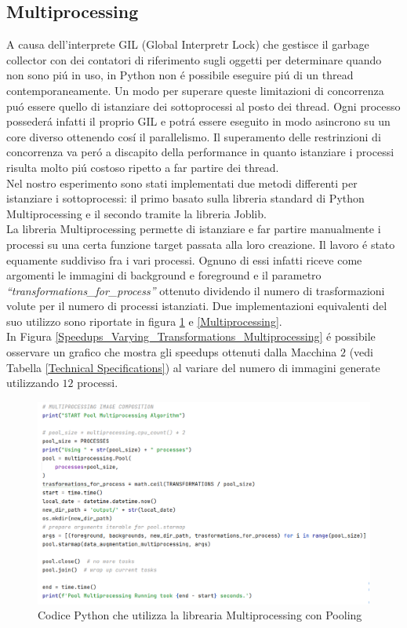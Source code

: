 \documentclass{article}
\begin{document}
\subsection{Multiprocessing}
A causa dell'interprete GIL (Global Interpretr Lock) che gestisce il garbage collector con dei contatori di riferimento sugli oggetti per determinare quando non sono pi\'u in uso, in Python non \'e possibile eseguire pi\'u di un thread contemporaneamente. Un modo per superare queste limitazioni di concorrenza pu\'o essere quello di istanziare dei sottoprocessi al posto dei thread. Ogni processo posseder\'a infatti il proprio GIL e potr\'a essere eseguito in modo asincrono su un core diverso ottenendo cos\'i il parallelismo. Il superamento delle restrinzioni di concorrenza va per\'o a discapito della performance in quanto istanziare i processi risulta molto pi\'u costoso ripetto a far partire dei thread.\\
Nel nostro esperimento sono stati implementati due metodi differenti per istanziare i sottoprocessi: il primo basato sulla libreria standard di Python Multiprocessing e il secondo tramite la libreria Joblib.\\
La libreria Multiprocessing permette di istanziare e far partire manualmente i processi su una certa funzione target passata alla loro creazione. Il lavoro \'e stato equamente suddiviso fra i vari processi. Ognuno di essi infatti riceve come argomenti le immagini di background e foreground e il parametro \textit{“transformations\_for\_process”} ottenuto dividendo il numero di trasformazioni volute per il numero di processi istanziati. Due implementazioni equivalenti del suo utilizzo sono riportate in figura \ref{Pool} e \ref{Multiprocessing}.
\\ In Figura \ref{Speedups_Varying_Transformations_Multiprocessing} \'e possibile osservare un grafico che mostra gli speedups ottenuti dalla Macchina $ 2 $ (vedi Tabella \ref{Technical Specifications}) al variare del numero di immagini generate utilizzando $ 12 $ processi.

\vspace{20px}

\begin{figure}[!h]
\centering
\includegraphics[width= 12.5cm]{"Immagini/Pool.PNG"}
\caption{Codice Python che utilizza la librearia Multiprocessing con Pooling}
\label{Pool}
\end{figure}
\end{document}
